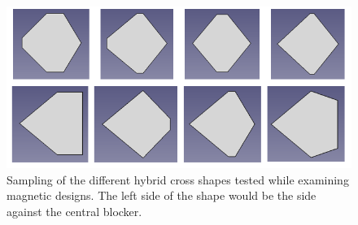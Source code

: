 \begin{figure}
    \centering
    \includegraphics[scale=0.8]{Future_Figs/Cross-Shape-Hybrid.png}
    \caption{Sampling of the different hybrid cross shapes tested while examining magnetic designs. The left side of the shape would be the side against the central blocker.}
    \label{fig:cross_shape_hybrid}
\end{figure}